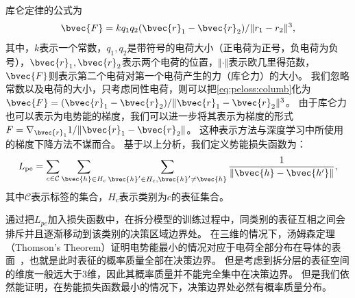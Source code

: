 库仑定律的公式为
\begin{equation}
\label{eq:peloss:columb}
    \bvec{F} =  k {q_1q_2(\bvec{r}_1 - \bvec{r}_2)}/{\Vert r_1 - r_2 \Vert^3},
\end{equation}
其中，$k$表示一个常数，$q_1, q_2$是带符号的电荷大小（正电荷为正号，负电荷为负号），$\bvec{r}_1, \bvec{r}_2$表示两个电荷的位置，$\Vert \cdot \Vert$表示欧几里得范数，$\bvec{F}$则表示第二个电荷对第一个电荷产生的力（库仑力）的大小。
%
我们忽略常数以及电荷的大小，只考虑同性电荷，则可以把\autoref{eq:peloss:columb}化为$\bvec{F} = (\bvec{r}_1 - \bvec{r}_2) / \Vert\bvec{r}_1 - \bvec{r}_2 \Vert^3$。
%
由于库仑力也可以表示为电势能的梯度，我们可以进一步将其表示为梯度的形式$F = \nabla_{\bvec{r}_1} 1/\Vert \bvec{r}_1 - \bvec{r}_2 \Vert$。
%
这种表示方法与深度学习中所使用的梯度下降方法不谋而合。
%
基于以上分析，我们定义势能损失函数为：
\begin{equation}
    L_\text{pe} = \sum\limits_{c\in\mathcal C}\sum\limits_{\bvec{h} \in H_c}\sum\limits_{\bvec{h}' \in H_c, \bvec{h}' \ne \bvec{h}} \dfrac{1}{\Vert \bvec{h} - \bvec{h'} \Vert},
\end{equation}
其中$\mathcal C$表示标签的集合，$H_c$表示类别为$c$的表征集合。


通过把$L_{pe}$加入损失函数中，在拆分模型的训练过程中，同类别的表征互相之间会排斥并且逐渐移动到该类别的决策区域边界处。
%
在三维的情况下，汤姆森定理（Thomson's Theorem）证明电势能最小的情况对应于电荷全部分布在导体的表面~\cite{thomson_1913_atom,bakhoum_2008_thomson_proof}，也就是此时表征的概率质量全部在决策边界。
%
但是考虑到拆分层的表征空间的维度一般远大于3维，因此其概率质量并不能完全集中在决策边界。
但是我们依然能证明，在势能损失函数最小的情况下，决策边界处必然有概率质量分布。

